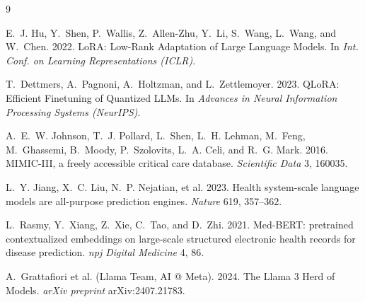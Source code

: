 \documentclass[sigconf,nonacm]{acmart}
\begin{document}
\begin{thebibliography}{9}

E.~J. Hu, Y.~Shen, P.~Wallis, Z.~Allen-Zhu, Y.~Li, S.~Wang, L.~Wang, and
W.~Chen. 2022.
\newblock LoRA: Low-Rank Adaptation of Large Language Models.
\newblock In \emph{Int. Conf. on Learning Representations (ICLR)}.

T.~Dettmers, A.~Pagnoni, A.~Holtzman, and L.~Zettlemoyer. 2023.
\newblock QLoRA: Efficient Finetuning of Quantized LLMs.
\newblock In \emph{Advances in Neural Information Processing Systems
(NeurIPS)}.

A.~E.~W. Johnson, T.~J. Pollard, L.~Shen, L.~H. Lehman, M.~Feng, M.~Ghassemi,
B.~Moody, P.~Szolovits, L.~A. Celi, and R.~G. Mark. 2016.
\newblock MIMIC-III, a freely accessible critical care database.
\newblock \emph{Scientific Data} 3, 160035.

L.~Y. Jiang, X.~C. Liu, N.~P. Nejatian, et al. 2023.
\newblock Health system-scale language models are all-purpose prediction
engines.
\newblock \emph{Nature} 619, 357--362.

L.~Rasmy, Y.~Xiang, Z.~Xie, C.~Tao, and D.~Zhi. 2021.
\newblock Med-BERT: pretrained contextualized embeddings on large-scale
structured electronic health records for disease prediction.
\newblock \emph{npj Digital Medicine} 4, 86.

A.~Grattafiori et al. (Llama Team, AI @ Meta). 2024.
\newblock The Llama 3 Herd of Models.
\newblock \emph{arXiv preprint} arXiv:2407.21783.

\end{thebibliography}
\end{document}
